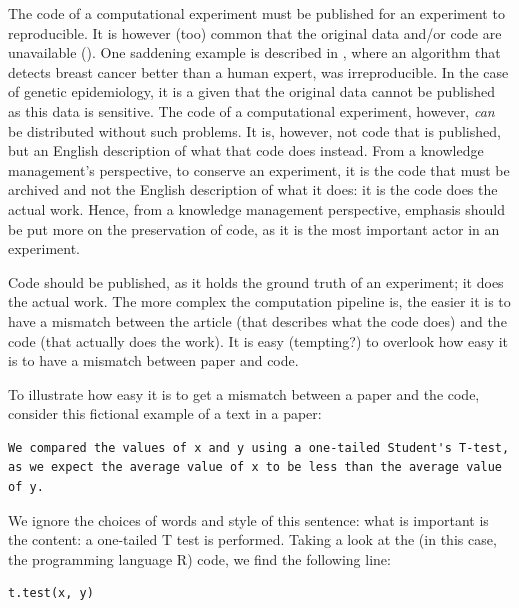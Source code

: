 The code of a computational experiment must be published
for an experiment to reproducible.
It is however (too) common that the original data
and/or code are unavailable (\cite{peng2021reproducible}).
One saddening example is described in \cite{haibe2020importance}, where
an algorithm that detects breast cancer better than a human expert,
was irreproducible.
In the case of genetic epidemiology, it is a given that the original
data cannot be published as this data is sensitive.
The code of a computational experiment, however, \emph{can} be
distributed without such problems.
It is, however, not code that is published, but an English
description of what that code does instead.
From a knowledge management's perspective,
to conserve an experiment,
it is the code that must be archived and not the
English description of what it does:
it is the code does the actual work.
Hence, from a knowledge management perspective, emphasis should be
put more on the preservation of code, as it is the most important actor
in an experiment.


Code should be published, as it holds the
ground truth of an experiment; it does the actual work.
The more complex the computation pipeline is, the easier it is
to have a mismatch between the article (that describes what the
code does) and the code (that actually does the work).
It is easy (tempting?) to overlook how easy it is to have a mismatch
between paper and code.

To illustrate how easy it is to get a mismatch between a paper
and the code, consider this fictional example
of a text in a paper:

\begin{verbatim}
We compared the values of x and y using a one-tailed Student's T-test,
as we expect the average value of x to be less than the average value of y.
\end{verbatim}

We ignore the choices of words and style of this sentence: what is
important is the content: a one-tailed T test is performed.
Taking a look at the (in this case, the programming language R) code, 
we find the following line:

\begin{verbatim}
t.test(x, y)
\end{verbatim}

